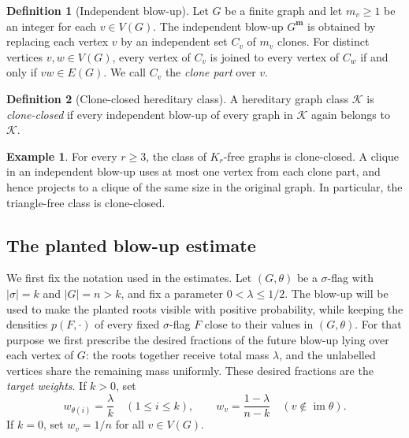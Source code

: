 \documentclass[11pt]{article}
\theoremstyle{definition}
\newtheorem{definition}[definition]{Definition}
\newtheorem{example}[example]{Example}
\newcommand{\K}{\mathcal{K}}
\begin{document}
\begin{definition}[Independent blow-up]\label{def:independent-blow-up}
Let $G$ be a finite graph and let $m_v\ge1$ be an integer for each
$v\in V(G)$.  The independent blow-up $G^{\mathbf m}$ is obtained by replacing
each vertex $v$ by an independent set $C_v$ of $m_v$ clones.  For distinct vertices
$v,w\in V(G)$, every vertex of $C_v$ is joined to every vertex of $C_w$ if and only if
$vw\in E(G)$.  We call $C_v$ the \emph{clone part} over $v$.
\end{definition}

\begin{definition}[Clone-closed hereditary class]
A hereditary graph class $\K$ is \emph{clone-closed} if every independent
blow-up of every graph in $\K$ again belongs to $\K$.
\end{definition}

\begin{example}
For every $r\ge3$, the class of $K_r$-free graphs is clone-closed.  A clique in
an independent blow-up uses at most one vertex from each clone part, and hence
projects to a clique of the same size in the original graph.  In particular, the
triangle-free class is clone-closed.
\end{example}

\subsection{The planted blow-up estimate}

We first fix the notation used in the estimates.  Let $(G,\theta)$ be a
$\sigma$-flag with $|\sigma|=k$ and $|G|=n>k$, and fix a parameter
$0<\lambda\le 1/2$.  The blow-up will be used to make the planted roots
visible with positive probability, while keeping the densities
$p(F,\cdot)$ of every fixed $\sigma$-flag $F$ close to their values in
$(G,\theta)$.  For that purpose we first prescribe the desired
fractions of the future blow-up lying over each vertex of $G$: the roots
together receive total mass $\lambda$, and the unlabelled vertices
share the remaining mass uniformly.  These desired fractions are the
\emph{target weights}.  If $k>0$, set
\[
  w_{\theta(i)}=\frac{\lambda}{k}\quad(1\le i\le k),
  \qquad
  w_v=\frac{1-\lambda}{n-k}\quad(v\notin\operatorname{im}\theta).
\]
If $k=0$, set $w_v=1/n$ for all $v\in V(G)$.
\end{document}
